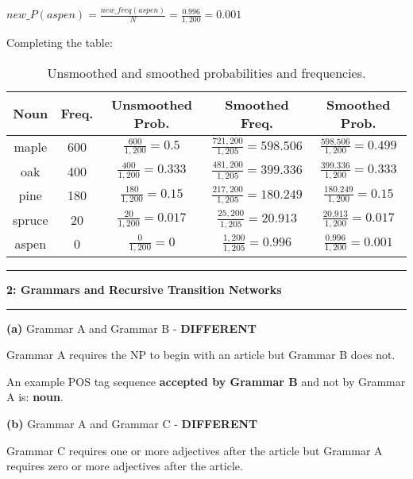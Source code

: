 \documentclass[11pt]{article}
\newcommand\question[2]{\vspace{.25in}\hrule\textbf{#1: #2}\vspace{.5em}\hrule\vspace{.10in}}
\renewcommand\part[1]{\vspace{.10in}\textbf{(#1)}}
\begin{document}
\qquad$new\_P(aspen) = \frac{new\_freq(aspen)}{N} = \frac{0.996}{1,200} = 0.001$

Completing the table:

\begin{table}[H]
\centering
{\renewcommand{\arraystretch}{1.7}
\begin{tabular}{| c | c | c | | c | c |}
\hline
\textbf{Noun} & \textbf{Freq.} & \textbf{Unsmoothed Prob.} & \textbf{Smoothed Freq.} & \textbf{Smoothed Prob.}\\
\hline
\hline
maple & 600 & $\frac{600}{1,200} = 0.5$ & $\frac{721,200}{1,205} = 598.506$ & $\frac{598.506}{1,200} = 0.499$ \\
\hline
oak & 400 & $\frac{400}{1,200} = 0.333$ & $\frac{481,200}{1,205} = 399.336$ & $\frac{399.336}{1,200} = 0.333$ \\
\hline
pine & 180 & $\frac{180}{1,200} = 0.15$ & $\frac{217,200}{1,205} = 180.249$ & $\frac{180.249}{1,200} = 0.15$ \\
\hline
spruce & 20 & $\frac{20}{1,200} = 0.017$ & $\frac{25,200}{1,205} = 20.913$ & $\frac{20.913}{1,200} = 0.017$ \\
\hline
aspen & 0 & $\frac{0}{1,200} = 0$ & $\frac{1,200}{1,205} = 0.996$ & $\frac{0.996}{1,200} = 0.001$ \\ 
\hline
\end{tabular}}
\caption{Unsmoothed and smoothed probabilities and frequencies.}
\end{table}
\newpage

\question{2}{Grammars and Recursive Transition Networks}

\part{a} Grammar A and Grammar B - \textbf{DIFFERENT}

Grammar A requires the NP to begin with an article but Grammar B does not. 

An example POS tag sequence \textbf{accepted by Grammar B} and not by Grammar A is: \textbf{noun}.\newline

\part{b} Grammar A and Grammar C - \textbf{DIFFERENT}

Grammar C requires one or more adjectives after the article but Grammar A requires zero or more adjectives after the article. 
\end{document}

